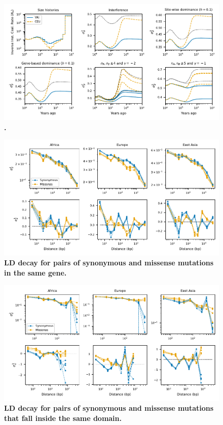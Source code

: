 \documentclass[]{article}
\begin{document}
\begin{figure}[ht!]
    \centering
    \includegraphics{../figures/demog_YRI_CEU.dominance.sd2}
    \caption{
        \textbf{.}
    }
    \label{fig:relate_dom_sd2}
\end{figure}

\begin{figure}[ht!]
    \centering
    \includegraphics{../figures/ld_decay_gene_wide}
    \caption{
        \textbf{LD decay for pairs of synonymous and missense mutations
        in the same gene.}
    }
    \label{fig:LDgene}
\end{figure}

\begin{figure}[ht!]
    \centering
    \includegraphics{../figures/ld_decay_in_domain}
    \caption{
        \textbf{LD decay for pairs of synonymous and missense mutations
        that fall inside the same domain.}
    }
    \label{fig:LDwithin}
\end{figure}
\end{document}
